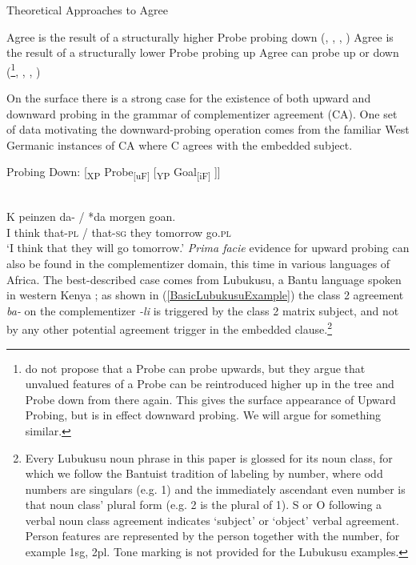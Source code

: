 \ea
Theoretical Approaches to Agree \label{TheoryApproaches}
\begin{xlist}
\ex Agree is the result of a structurally higher Probe probing down (\citealt{Chomsky:2000a}, \citealt{Chomsky:2001}, \citealt{Preminger:2013}, \citealt{Polinsky:2015}) 
\ex Agree is the result of a structurally lower Probe probing up \citep{Zeijlstra:2012, Wurmbrand:2011, Bjorkman:toappearb} 
\ex Agree can probe up or down (\citealt{Bejar:2009}\footnote{\citet{Bejar:2009} do not propose that a Probe can probe upwards, but they argue that unvalued features of a Probe can be reintroduced higher up in the tree and Probe down from there again. This gives the surface appearance of Upward Probing, but is in effect downward probing. We will argue for something similar.}, \citealt{Baker:2008}, \citealt{Putnam:2011}, \citealt{Carstens:2016})
\end{xlist}
\z
\noindent On the surface there is a strong case for the existence of both upward and downward probing in the grammar of complementizer agreement (CA). One set of data motivating the downward-probing operation comes from the familiar West Germanic instances of CA where C agrees with the embedded subject.

\ea \label{ProbeDownSchematic}
Probing Down: [\textsubscript{XP} Probe\textsubscript{[uF]} [\textsubscript{YP} Goal\textsubscript{[iF]} ]]
\z

\ea \label{WestFlemFirstExample}
 \\
\gll K peinzen 	da- /   *da\circled{-\O}        	 	morgen 	goan. \\
I think that-\textsc{pl} / that-\textsc{sg} they tomorrow go.\textsc{pl} \\
\glt `I think that they will go tomorrow.' 	
\z						
\noindent \textit{Prima facie} evidence for upward probing can also be found in the complementizer domain, this time in various languages of Africa. The best-described case comes from Lubukusu, a Bantu language spoken in western Kenya \citep{Diercks:2010,Diercks:2013,Wasike:2007}; as shown in (\ref{BasicLubukusuExample}) the class 2 agreement \textit{ba-} on the complementizer \textit{-li} is triggered by the class 2 matrix subject, and not by any other potential agreement trigger in the embedded clause.\footnote{
	Every Lubukusu noun phrase in this paper is glossed for its noun class, for which we follow the Bantuist tradition of labeling by number, where odd numbers are singulars (e.g. 1) and the immediately ascendant even number is that noun class’ plural form (e.g. 2 is the plural of 1).  S or O following a verbal noun class agreement indicates ‘subject’ or ‘object’ verbal agreement.  Person features are represented by the person together with the number, for example 1sg, 2pl. Tone marking is not provided for the Lubukusu examples.}

